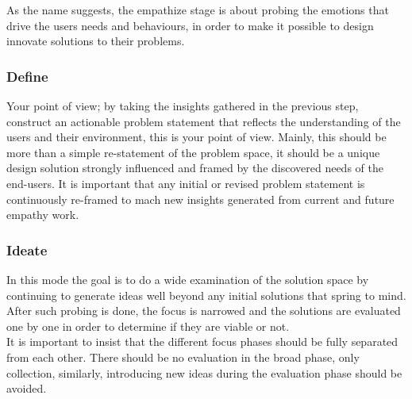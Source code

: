 \documentclass[a4paper,11pt]{article}
\newcounter{counterTODO}\setcounter{counterTODO}{1}
\newcommand\TODO[2][]{%
  \ifshowTodo{%
    \def\varTODOtext{\textcolor{purple}{\texttt{<}\textbf{TODO}\#\arabic{counterTODO}\texttt{: #2>}}}
    \def\varTODOContentLine{\textcolor{purple}{#2}}
    \ifthenelse{\isempty{#1}}%
      {%
        \addcontentsline{tocTODO}{section}{\vspace{-0.3cm}\varTODOContentLine}%
        \varTODOtext\\%
      }%
      {%
        \addcontentsline{tocTODO}{section}{\vspace{-0.3cm}\sout{\varTODOContentLine}}%
      }%
      \stepcounter{counterTODO}%
  }\fi%
}
\newif\ifshowTodo
\begin{document}
      As the name suggests, the empathize stage is about probing the emotions
      that drive the users needs and behaviours, in order to make it possible to
      design innovate solutions to their problems.



    \subsubsection{Define}

      Your point of view; by taking the insights gathered in the previous step,
      construct an actionable problem statement that reflects the understanding
      of the users and their environment, this is your point of view.
      Mainly, this should be more than a simple re-statement of the problem
      space, it should be a unique design solution strongly influenced and
      framed by the discovered needs of the end-users. It is important that any
      initial or revised problem statement is continuously re-framed to mach new
      insights generated from current and future empathy work.

    \subsubsection{Ideate}

      In this mode the goal is to do a wide examination of the solution space by
      continuing to generate ideas well beyond any initial solutions that spring
      to mind. After such probing is done, the focus is narrowed and the
      solutions are evaluated one by one in order to determine if they are
      viable or not. \\

        \TODO[]{Create ideate-focus-cycle-graphic.pdf}

      It is important to insist that the different focus phases should be fully
      separated from each other. There should be no evaluation in the broad
      phase, only collection, similarly, introducing new ideas during the
      evaluation phase should be avoided.

      \TODO[]{Include break intrinsic bias / framing á design}
\end{document}
